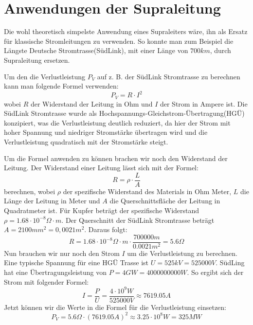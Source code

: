 \section{Anwendungen der Supraleitung}
Die wohl theoretisch simpelste Anwendung eines Supraleiters wäre, ihn als Ersatz für klassische Stromleitungen zu 
verwenden. So konnte man zum Beispiel die Längste Deutsche Stromtrasse(SüdLink), mit einer Länge von $700km$, 
durch Supraleitung ersetzen. 

Um den die Verlustleistung $P_V$ auf z. B. der SüdLink Stromtrasse zu berechnen kann man folgende Formel verwenden:
\begin{equation}
    P_V = R \cdot I^2
\end{equation}
wobei $R$ der Widerstand der Leitung in Ohm und $I$ der Strom in Ampere ist.
Die SüdLink Stromtrasse wurde als Hochspannungs-Gleichstrom-Übertragung(HGÜ) konzipiert, was die Verlustleistung
deutlich reduziert, da hier der Strom mit hoher Spannung und niedriger Stromstärke übertragen wird und die Verlustleistung
quadratisch mit der Stromstärke steigt.

Um die Formel anwenden zu können brachen wir noch den Widerstand der Leitung. Der Widerstand einer Leitung lässt sich
mit der Formel:
\begin{equation}
    R = \rho \cdot \frac{L}{A}
\end{equation}
berechnen, wobei $\rho$ der spezifische Widerstand des Materials in Ohm Meter, $L$ die Länge der Leitung in Meter und $A$
die Querschnittsfläche der Leitung in Quadratmeter ist. Für Kupfer beträgt der spezifische Widerstand $\rho = 1.68 \cdot 10^{-8} \Omega \cdot m$.
Der Querschnitt der SüdLink Stromtrasse beträgt $A=2100mm^2 = 0,0021m^2$. Daraus folgt:
\begin{equation}
    R = 1.68 \cdot 10^{-8} \Omega \cdot m \cdot \frac{700000m}{0.0021m^2} = 5.6 \Omega
\end{equation}
Nun brauchen wir nur noch den Strom $I$ um die Verlustleistung zu berechnen. Eine typische Spannung für eine HGÜ Trasse 
ist $U = 525kV = 525000V$. SüdLing hat eine Übertragungsleistung von $P = 4GW = 4000000000W$. So ergibt sich der Strom mit folgender Formel:
\begin{equation}
    I = \frac{P}{U} = \frac{4 \cdot 10^9W}{525000V} \approx 7619.05A
\end{equation}
Jetzt können wir die Werte in die Formel für die Verlustleistung einsetzen:
\begin{equation}
    P_V = 5.6 \Omega \cdot (7619.05A)^2 \approx 3.25 \cdot 10^8W = 325MW
\end{equation}

